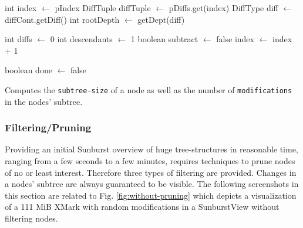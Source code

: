 \begin{algorithm}[tb]
{}
\BlankLine
int index $\leftarrow$ pIndex\;
DiffTuple diffTuple $\leftarrow$ pDiffs.get(index)\;
DiffType diff $\leftarrow$ diffCont.getDiff()\;
int rootDepth $\leftarrow$ getDept(diff)\;

int diffs $\leftarrow$ 0\;
int descendants $\leftarrow$ 1\;
boolean subtract $\leftarrow$ false\;
index $\leftarrow$ index + 1\;


boolean done $\leftarrow$ false\;
\caption{Computes the \texttt{subtree-size} of a node as well as the number of \texttt{modifications} in the nodes' subtree.}\label{algo:descModCount}
\end{algorithm}

\subsubsection{Filtering/Pruning}
Providing an initial Sunburst overview of huge tree-struc\-tures in reasonable time, ranging from a few seconds to a few minutes, requires techniques to prune nodes of no or least interest. Therefore three types of filtering are provided. Changes in a nodes' subtree are always guaranteed to be visible. The following screenshots in this section are related to Fig. \ref{fig:without-pruning} which depicts a visualization of a 111 MiB XMark with random modifications in a SunburstView without filtering nodes.

